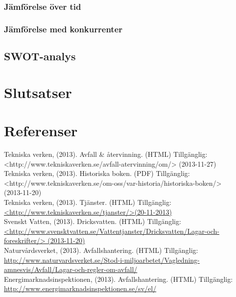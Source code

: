 \documentclass[10pt,a4paper]{article}
\begin{document}
\subsubsection{Jämförelse över tid}


\subsubsection{Jämförelse med konkurrenter}

\subsection{SWOT-analys}

\section{Slutsatser}

\newpage
\section{Referenser}
Tekniska verken, (2013). Avfall \& återvinning. (HTML) Tillgänglig: \\
<http://www.tekniskaverken.se/avfall-atervinning/om/> (2013-11-27) \\
\newline
Tekniska verken, (2013). Historiska boken. (PDF) Tillgänglig: \\
<http://www.tekniskaverken.se/om-oss/var-historia/historiska-boken/> \\
(2013-11-20)\\
\newline
Tekniska verken, (2013). Tjänster. (HTML) Tillgänglig: \\
\hyperref{http://www.tekniskaverken.se/tjanster/}{}{}{<http://www.tekniskaverken.se/tjanster/>(20-11-2013)}\\
\newline
Svenskt Vatten, (2013). Dricksvatten. (HTML) Tillgänglig: \\
\hyperref{http://www.svensktvatten.se/Vattentjanster/Dricksvatten/Lagar-och-foreskrifter/}{}{}{<http://www.svensktvatten.se/Vattentjanster/Dricksvatten/Lagar-och-foreskrifter/>
(2013-11-20)} \\
\newline
Naturvårdsverket, (2013). Avfallshantering. (HTML) Tillgänglig: \\
\hyperref{http://www.naturvardsverket.se/Stod-i-miljoarbetet/Vagledning-amnesvis/Avfall/Lagar-och-regler-om-avfall/}{}{}{http://www.naturvardsverket.se/Stod-i-miljoarbetet/Vagledning-amnesvis/Avfall/Lagar-och-regler-om-avfall/}\\
\newline
Energimarknadsinspektionen, (2013). Avfallshantering. (HTML) Tillgänglig: \\
\hyperref{http://www.energimarknadsinspektionen.se/sv/el/}{}{}{http://www.energimarknadsinspektionen.se/sv/el/}\\
\end{document}
